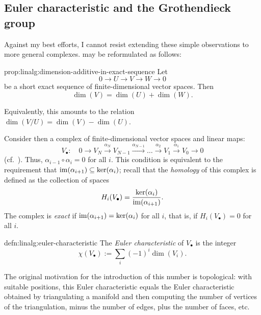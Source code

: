 \subsection{Euler characteristic and the Grothendieck group}
\label{subsec:linalg:euler-characteristic-and-the-grothendieck-group}
Against my best efforts, I cannot resist extending these simple
observations to more general complexes.  may be
reformulated as follows:
\begin{prop}{}{prop:linalg:dimension-additive-in-exact-sequence}
  Let
  \[
    0 \to U \to V \to W \to 0
  \]
  be a short exact sequence of finite-dimensional vector spaces. Then
  \[
    \dim(V) = \dim(U) + \dim(W).
  \]
\end{prop}
Equivalently, this amounts to the relation
$\dim(V/U) = \dim(V) - \dim(U)$.

Consider then a complex of finite-dimensional vector spaces and linear
maps:
\[
  V_\bullet : \quad 0 \to V_N \xrightarrow{\alpha_N} V_{N-1}
  \xrightarrow{\alpha_{N-1}} \dots \xrightarrow{\alpha_2} V_1
  \xrightarrow{\alpha_1} V_0 \to 0
\]
(cf.\ ). Thus,
$\alpha_{i-1} \circ \alpha_i = 0$ for all $i$.  This condition is
equivalent to the requirement that
$\operatorname{im}(\alpha_{i+1}) \subseteq \ker(\alpha_i)$; recall that the
\emph{homology} of this complex is defined as the collection of spaces
\[
  H_i(V_\bullet) = \frac{\ker(\alpha_i)}{\operatorname{im}(\alpha_{i+1})}.
\]
The complex is \emph{exact} if $\operatorname{im}(\alpha_{i+1}) = \ker(\alpha_i)$
for all $i$, that is, if $H_i(V_\bullet) = 0$ for all $i$.

\begin{defn}{}{defn:linalg:euler-characteristic}
  The \emph{Euler characteristic} of $V_\bullet$ is the integer
  \[
    \chi(V_\bullet) := \sum_i (-1)^i \dim(V_i).
  \]
\end{defn}
The original motivation for the introduction of this number is
topological: with suitable positions, this Euler characteristic equals
the Euler characteristic obtained by triangulating a manifold and then
computing the number of vertices of the triangulation, minus the
number of edges, plus the number of faces, etc.


